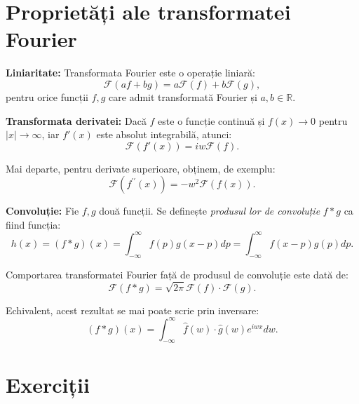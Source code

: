 \documentclass[12pt,a4paper]{article}
\newcommand\kal{\mathcal}
\newcommand\RR{\mathbb{R}}
\theoremstyle{dotless}
\theoremstyle{dotlessdr}
\begin{document}
\section*{Proprietăți ale transformatei Fourier}


\indent\indent \textbf{Liniaritate:} Transformata Fourier este o operație liniară:
\[
  \kal{F}(af + bg) = a \kal{F}(f) + b \kal{F}(g),
\]
pentru orice funcții $ f, g $ care admit transformată Fourier și $ a, b \in \RR $.

\vspace{1cm}

\textbf{Transformata derivatei:} Dacă $ f $ este o funcție continuă și $ f(x) \to 0 $
pentru $ |x| \to \infty $, iar $ f'(x) $ este absolut integrabilă, atunci:
\[
  \kal{F}(f'(x)) = iw \kal{F}(f).
\]

Mai departe, pentru derivate superioare, obținem, de exemplu:
\[
  \kal{F}(f^{\prime\prime}(x)) = -w^2 \kal{F}(f(x)).
\]

\vspace{1cm}

\textbf{Convoluție:} Fie $ f, g $ două funcții. Se definește \emph{produsul lor de %
  convoluție} $ f \ast g $ ca fiind funcția:
\[
  h(x) = (f \ast g)(x) = \int_{-\infty}^\infty f(p) g(x-p) dp = %
  \int_{-\infty}^\infty f(x - p) g(p) dp.
\]

Comportarea transformatei Fourier față de produsul de convoluție este dată de:
\[
  \kal{F}(f \ast g) = \sqrt{2\pi} \kal{F}(f) \cdot \kal{F}(g).
\]

Echivalent, acest rezultat se mai poate scrie prin inversare:
\[
  (f \ast g)(x) = \int_{-\infty}^\infty \widehat{f}(w) \cdot \widehat{g}(w) e^{iwx} dw.
\]


\section*{Exerciții}
\end{document}
